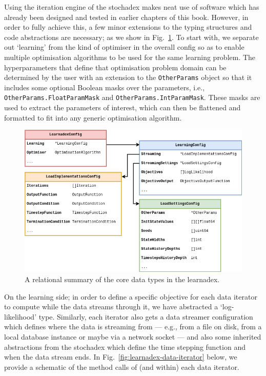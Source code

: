 Using the iteration engine of the stochadex makes neat use of software which has already been designed and tested in earlier chapters of this book. However, in order to fully achieve this, a few minor extensions to the typing structures and code abstractions are necessary; as we show in Fig.~\ref{fig:learnadex-data-types-design}. To start with, we separate out `learning' from the kind of optimiser in the overall config so as to enable multiple optimisation algorithms to be used for the same learning problem. The hyperparameters that define that optimisation problem domain can be determined by the user with an extension to the \texttt{OtherParams} object so that it includes some optional Boolean masks over the parameters, i.e., \texttt{OtherParams.FloatParamMask} and \texttt{OtherParams.IntParamMask}. These masks are used to extract the parameters of interest, which can then be flattened and formatted to fit into any generic optimisation algorithm.

\begin{figure}[h]
\centering
\includegraphics[width=12cm]{images/chapter-4-learnadex-data-types.drawio.png}
\caption{A relational summary of the core data types in the learnadex.}
\label{fig:learnadex-data-types-design}
\end{figure}

On the learning side; in order to define a specific objective for each data iterator to compute while the data streams through it, we have abstracted a `log-likelihood' type. Similarly, each iterator also gets a data streamer configuration which defines where the data is streaming from --- e.g., from a file on disk, from a local database instance or maybe via a network socket --- and also some inherited abstractions from the stochadex which define the time stepping function and when the data stream ends. In Fig.~\ref{fig:learnadex-data-iterator} below, we provide a schematic of the method calls of (and within) each data iterator.

